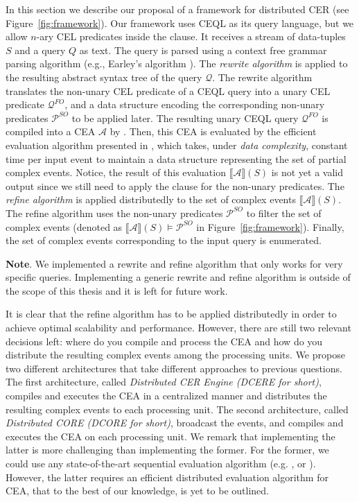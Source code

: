 In this section we describe our proposal of a framework for distributed CER (see Figure~\ref{fig:framework}). Our framework uses CEQL as its query language, but we allow $n$-ary CEL predicates inside the  clause. It receives a stream of data-tuples $S$ and a query $Q$ as text. The query is parsed using a context free grammar parsing algorithm (e.g., Earley's algorithm \cite{earley}). The \emph{rewrite algorithm} is applied to the resulting abstract syntax tree of the query $\mathcal{Q}$. The rewrite algorithm translates the non-unary CEL predicate of a CEQL query into a unary CEL predicate $\mathcal{Q}^{FO}$, and a data structure encoding the corresponding non-unary predicates $\mathcal{P}^{SO}$ to be applied later. The resulting unary CEQL query $\mathcal{Q}^{FO}$ is compiled into a CEA $\mathcal{A}$ by \cite[Theorem~6.2]{formal-framework-cer}. Then, this CEA is evaluated by the efficient evaluation algorithm presented in \cite{core}, which takes, under \emph{data complexity}, constant time per input event to maintain a data structure representing the set of partial complex events. Notice, the result of this evaluation ${\llbracket \mathcal{A} \rrbracket}(S)$ is not yet a valid output since we still need to apply the  clause for the non-unary predicates. The \emph{refine algorithm} is applied distributedly to the set of complex events ${\llbracket \mathcal{A} \rrbracket}(S)$. The refine algorithm uses the non-unary predicates $\mathcal{P}^{SO}$ to filter the set of complex events (denoted as ${\llbracket \mathcal{A} \rrbracket}(S) \models \mathcal{P}^{SO}$ in Figure~\ref{fig:framework}). Finally, the set of complex events corresponding to the input query is enumerated.

\textbf{Note}. We implemented a rewrite and refine algorithm that only works for very specific queries. Implementing a generic rewrite and refine algorithm is outside of the scope of this thesis and it is left for future work.

It is clear that the refine algorithm has to be applied distributedly in order to achieve optimal scalability and performance.
However, there are still two relevant decisions left: where do you compile and process the CEA and how do you distribute the resulting complex events among the processing units. We propose two different architectures that take different approaches to previous questions. The first architecture, called \emph{Distributed CER Engine (DCERE for short)}, compiles and executes the CEA in a centralized manner and distributes the resulting complex events to each processing unit. The second architecture, called \emph{Distributed CORE (DCORE for short)}, broadcast the events, and compiles and executes the CEA on each processing unit. We remark that implementing the latter is more challenging than implementing the former. For the former, we could use any state-of-the-art sequential evaluation algorithm (e.g. \cite{formal-framework-cer}, or \cite{core}). However, the latter requires an efficient distributed evaluation algorithm for CEA, that to the best of our knowledge, is yet to be outlined.

